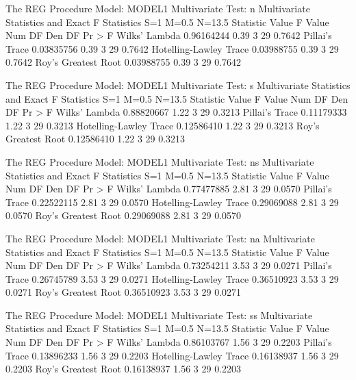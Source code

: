 \documentclass{article}
\begin{document}
\begin{Woutput}
The REG Procedure
Model: MODEL1
Multivariate Test: n
                Multivariate Statistics and Exact F Statistics
                            S=1    M=0.5    N=13.5
Statistic                        Value    F Value    Num DF    Den DF    Pr > F
Wilks' Lambda               0.96164244       0.39         3        29    0.7642
Pillai's Trace              0.03835756       0.39         3        29    0.7642
Hotelling-Lawley Trace      0.03988755       0.39         3        29    0.7642
Roy's Greatest Root         0.03988755       0.39         3        29    0.7642

The REG Procedure
Model: MODEL1
Multivariate Test: s
                Multivariate Statistics and Exact F Statistics
                            S=1    M=0.5    N=13.5
Statistic                        Value    F Value    Num DF    Den DF    Pr > F
Wilks' Lambda               0.88820667       1.22         3        29    0.3213
Pillai's Trace              0.11179333       1.22         3        29    0.3213
Hotelling-Lawley Trace      0.12586410       1.22         3        29    0.3213
Roy's Greatest Root         0.12586410       1.22         3        29    0.3213

The REG Procedure
Model: MODEL1
Multivariate Test: ns
                Multivariate Statistics and Exact F Statistics
                            S=1    M=0.5    N=13.5
Statistic                        Value    F Value    Num DF    Den DF    Pr > F
Wilks' Lambda               0.77477885       2.81         3        29    0.0570
Pillai's Trace              0.22522115       2.81         3        29    0.0570
Hotelling-Lawley Trace      0.29069088       2.81         3        29    0.0570
Roy's Greatest Root         0.29069088       2.81         3        29    0.0570

The REG Procedure
Model: MODEL1
Multivariate Test: na
                Multivariate Statistics and Exact F Statistics
                            S=1    M=0.5    N=13.5
Statistic                        Value    F Value    Num DF    Den DF    Pr > F
Wilks' Lambda               0.73254211       3.53         3        29    0.0271
Pillai's Trace              0.26745789       3.53         3        29    0.0271
Hotelling-Lawley Trace      0.36510923       3.53         3        29    0.0271
Roy's Greatest Root         0.36510923       3.53         3        29    0.0271

The REG Procedure
Model: MODEL1
Multivariate Test: ss
                Multivariate Statistics and Exact F Statistics
                            S=1    M=0.5    N=13.5
Statistic                        Value    F Value    Num DF    Den DF    Pr > F
Wilks' Lambda               0.86103767       1.56         3        29    0.2203
Pillai's Trace              0.13896233       1.56         3        29    0.2203
Hotelling-Lawley Trace      0.16138937       1.56         3        29    0.2203
Roy's Greatest Root         0.16138937       1.56         3        29    0.2203


\end{Woutput}
\end{document}
